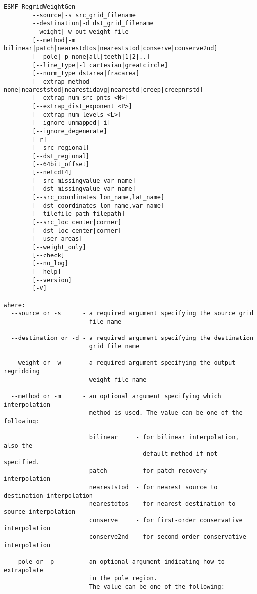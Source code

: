 \begin{verbatim}
ESMF_RegridWeightGen  
        --source|-s src_grid_filename
        --destination|-d dst_grid_filename
        --weight|-w out_weight_file
        [--method|-m bilinear|patch|nearestdtos|neareststod|conserve|conserve2nd]
        [--pole|-p none|all|teeth|1|2|..]
        [--line_type|-l cartesian|greatcircle]
        [--norm_type dstarea|fracarea]
        [--extrap_method none|neareststod|nearestidavg|nearestd|creep|creepnrstd]
        [--extrap_num_src_pnts <N>]
        [--extrap_dist_exponent <P>]
        [--extrap_num_levels <L>]
        [--ignore_unmapped|-i]
        [--ignore_degenerate]
        [-r]
        [--src_regional]
        [--dst_regional]
        [--64bit_offset]
        [--netcdf4]
        [--src_missingvalue var_name]
        [--dst_missingvalue var_name]
        [--src_coordinates lon_name,lat_name]
        [--dst_coordinates lon_name,var_name]
        [--tilefile_path filepath]
        [--src_loc center|corner]
        [--dst_loc center|corner]
        [--user_areas]
        [--weight_only]
        [--check]
        [--no_log]
        [--help]
        [--version]
        [-V]

where:
  --source or -s      - a required argument specifying the source grid
                        file name

  --destination or -d - a required argument specifying the destination
                        grid file name

  --weight or -w      - a required argument specifying the output regridding
                        weight file name

  --method or -m      - an optional argument specifying which interpolation
                        method is used. The value can be one of the following:

                        bilinear     - for bilinear interpolation, also the
                                       default method if not specified.
                        patch        - for patch recovery interpolation
                        neareststod  - for nearest source to destination interpolation
                        nearestdtos  - for nearest destination to source interpolation
                        conserve     - for first-order conservative interpolation
                        conserve2nd  - for second-order conservative interpolation

  --pole or -p        - an optional argument indicating how to extrapolate 
                        in the pole region. 
                        The value can be one of the following:


\end{verbatim}
